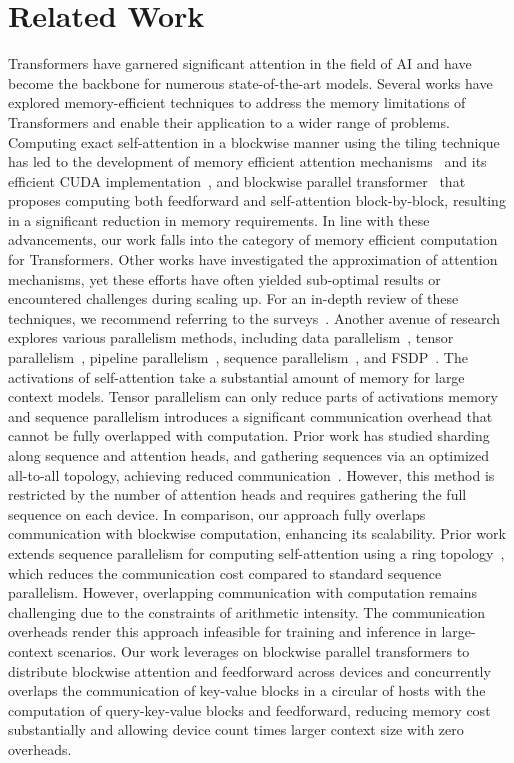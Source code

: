 \section{Related Work} Transformers have garnered significant attention in the field of AI and have become the backbone for numerous state-of-the-art models. Several works have explored memory-efficient techniques to address the memory limitations of Transformers and enable their application to a wider range of problems. Computing exact self-attention in a blockwise manner using the tiling technique~\citep{milakov2018online} has led to the development of memory efficient attention mechanisms~\citep{rabe2021self} and its efficient CUDA implementation~\citep{dao2022flashattention}, and blockwise parallel transformer~\citep{liu2023blockwise} that proposes computing both feedforward and self-attention block-by-block, resulting in a significant reduction in memory requirements. In line with these advancements, our work falls into the category of memory efficient computation for Transformers. Other works have investigated the approximation of attention mechanisms, yet these efforts have often yielded sub-optimal results or encountered challenges during scaling up. For an in-depth review of these techniques, we recommend referring to the surveys~\citep{narang2021transformer, tay2022scaling}. Another avenue of research explores various parallelism methods, including data parallelism~\citep{dean2012large}, tensor parallelism~\citep{shoeybi2019megatron}, pipeline parallelism~\citep{narayanan2019pipedream,huang2019gpipe, narayanan2021memory}, sequence parallelism~\citep{li2021sequence, korthikanti2022reducing,jacobs2023deepspeed}, and FSDP~\citep{fbFullySharded, rajbhandari2020zero}. The activations of self-attention take a substantial amount of memory for large context models. Tensor parallelism can only reduce parts of activations memory and sequence parallelism introduces a significant communication overhead that cannot be fully overlapped with computation. Prior work has studied sharding along sequence and attention heads, and gathering sequences via an optimized all-to-all topology, achieving reduced communication~\citep{jacobs2023deepspeed}. However, this method is restricted by the number of attention heads and requires gathering the full sequence on each device. In comparison, our approach fully overlaps communication with blockwise computation, enhancing its scalability. Prior work extends sequence parallelism for computing self-attention using a ring topology~\citep{li2021sequence}, which reduces the communication cost compared to standard sequence parallelism. However, overlapping communication with computation remains challenging due to the constraints of arithmetic intensity. The communication overheads render this approach infeasible for training and inference in large-context scenarios. Our work leverages on blockwise parallel transformers to distribute blockwise attention and feedforward across devices and concurrently overlaps the communication of key-value blocks in a circular of hosts with the computation of query-key-value blocks and feedforward, reducing memory cost substantially and allowing device count times larger context size with zero overheads. 